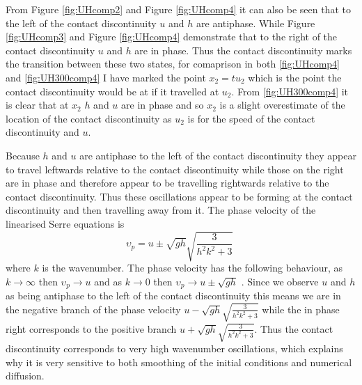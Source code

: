 \documentclass[SingleSpace,12pt,Proceedings]{Serre_ASCE}
\begin{document}
From Figure \ref{fig:UHcomp2} and Figure \ref{fig:UHcomp4} it can also be seen that to the left of the contact discontinuity $u$ and $h$ are antiphase. While Figure \ref{fig:UHcomp3} and Figure \ref{fig:UHcomp4} demonstrate that to the right of the contact discontinuity $u$ and $h$ are in phase. Thus the contact discontinuity marks the transition between these two states, for comaprison in both \ref{fig:UHcomp4} and \ref{fig:UH300comp4} I have marked the point $x_2 = tu_2$ which is the point the contact discontinuity would be at if it travelled at $u_2$. From \ref{fig:UH300comp4} it is clear that at $x_2$ $h$ and $u$ are in phase and so $x_2$ is a slight overestimate of the location of the contact discontinuity as $u_2$ is for the speed of the contact discontinuity and $u$.

Because $h$ and $u$ are antiphase to the left of the contact discontinuity they appear to travel leftwards relative to the contact discontinuity while those on the right are in phase and therefore appear to be travelling rightwards relative to the contact discontinuity. Thus these oscillations appear to be forming at the contact discontinuity and then travelling away from it. The phase velocity of the linearised Serre equations is 
\[\upsilon_p = u \pm \sqrt{gh} \sqrt{\frac{3}{h^2 k^2 + 3}} \; \]
where $k$ is the wavenumber. The phase velocity has the following behaviour, as $k \rightarrow \infty$ then $\upsilon_p \rightarrow u$ and as $k \rightarrow 0$ then $\upsilon_p \rightarrow u \pm \sqrt{gh}$ . Since we observe $u$ and $h$ as being antiphase to the left of the contact discontinuity this means we are in the negative branch of the phase velocity $u - \sqrt{gh} \sqrt{\frac{3}{h^2 k^2 + 3}}$ while the in phase right corresponds to the positive branch  $u + \sqrt{gh} \sqrt{\frac{3}{h^2 k^2 + 3}}$. Thus the contact discontinuity corresponds to very high wavenumber oscillations, which explains why it is very sensitive to both smoothing of the initial conditions and numerical diffusion.   

\end{document}
